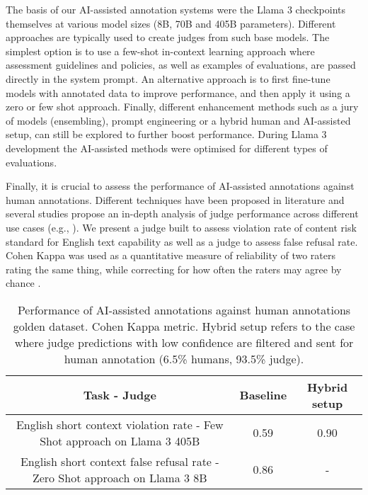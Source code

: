 The basis of our AI-assisted annotation systems were the Llama 3 checkpoints themselves at various model sizes (8B, 70B and 405B parameters). Different approaches are typically used to create judges from such base models. The simplest option is to use a few-shot in-context learning approach where assessment guidelines and policies, as well as examples of evaluations, are passed directly in the system prompt. An alternative approach is to first fine-tune models with annotated data to improve performance, and then apply it using a zero or few shot approach. Finally, different enhancement methods such as a jury of models (ensembling), prompt engineering or a hybrid human and AI-assisted setup, can still be explored to further boost performance. During Llama 3 development the AI-assisted methods were optimised for different types of evaluations.

Finally, it is crucial to assess the performance of AI-assisted annotations against human annotations. Different techniques have been proposed in literature and several studies propose an in-depth analysis of judge performance across different use cases (e.g., \cite{huang2024limitationsfinetunedjudgemodels, zheng2023judgingllmasajudgemtbenchchatbot}). We present a judge built to assess violation rate of content risk standard for English text capability as well as a judge to assess false refusal rate. Cohen Kappa was used as a quantitative measure of reliability of two raters rating the same thing, while correcting for how often the raters may agree by chance \cite{cohen1960}.

\begin{table}[h!]
\centering
\begin{tabular}{||c | c | c ||}
 \hline
 Task - Judge & Baseline & Hybrid setup \\
 \hline\hline
 English short context violation rate - Few Shot approach on Llama 3 405B & 0.59 & 0.90  \\
 English short context false refusal rate - Zero Shot approach on Llama 3 8B & 0.86 & -  \\
 \hline
\end{tabular}
\caption{Performance of AI-assisted annotations against human annotations golden dataset. Cohen Kappa metric. Hybrid setup refers to the case where judge predictions with low confidence are filtered and sent for human annotation (6.5\% humans, 93.5\% judge).}
\label{table:judge-performance}
\end{table}


